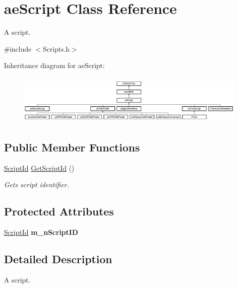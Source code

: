 \hypertarget{classae_script}{}\section{ae\+Script Class Reference}
\label{classae_script}


A script.  




{\ttfamily \#include $<$Scripts.\+h$>$}

Inheritance diagram for ae\+Script\+:\begin{figure}[H]
\begin{center}
\leavevmode
\includegraphics[height=2.430556cm]{classae_script}
\end{center}
\end{figure}
\subsection*{Public Member Functions}
\begin{DoxyCompactItemize}
\item 
\hyperlink{_scripts_8h_a5d3f231722ed23af7cf63216ade194f4}{Script\+Id} \hyperlink{classae_script_a4c7148b3f1a9ef7bda547670ead77acb}{Get\+Script\+Id} ()
\begin{DoxyCompactList}\small\item\em Gets script identifier. \end{DoxyCompactList}\end{DoxyCompactItemize}
\subsection*{Protected Attributes}
\begin{DoxyCompactItemize}
\item 
\hyperlink{_scripts_8h_a5d3f231722ed23af7cf63216ade194f4}{Script\+Id} {\bfseries m\+\_\+n\+Script\+ID}\hypertarget{classae_script_a171079568b73728009ecf964a8196f5c}{}\label{classae_script_a171079568b73728009ecf964a8196f5c}

\end{DoxyCompactItemize}


\subsection{Detailed Description}
A script. 

